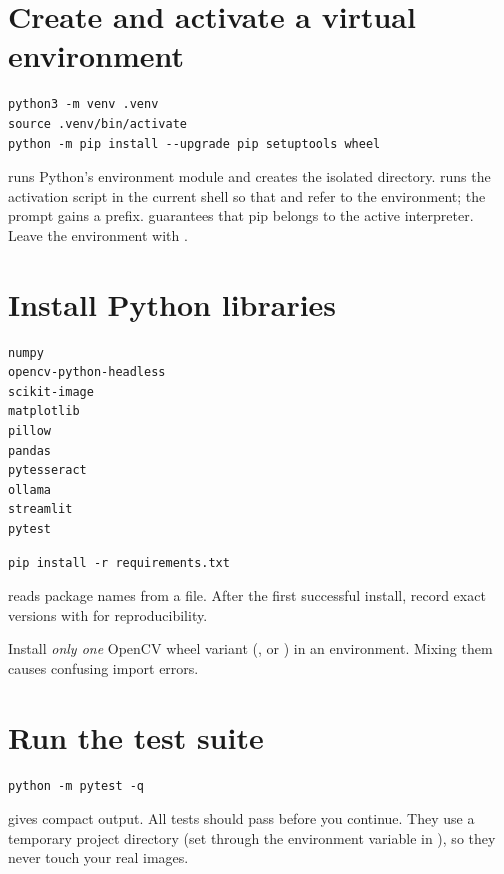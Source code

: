 \section{Create and activate a virtual environment}
\begin{lstlisting}[style=sh]
python3 -m venv .venv
source .venv/bin/activate
python -m pip install --upgrade pip setuptools wheel
\end{lstlisting}
 runs Python's environment module and creates the isolated  directory.  runs the activation script in the current shell so that  and  refer to the environment; the prompt gains a  prefix.  guarantees that pip belongs to the active interpreter. Leave the environment with .

\section{Install Python libraries}
\begin{lstlisting}[style=plain,caption={requirements.txt}]
numpy
opencv-python-headless
scikit-image
matplotlib
pillow
pandas
pytesseract
ollama
streamlit
pytest
\end{lstlisting}
\begin{lstlisting}[style=sh]
pip install -r requirements.txt
\end{lstlisting}
 reads package names from a file. After the first successful install, record exact versions with  for reproducibility.

\begin{warnbox}
Install \emph{only one} OpenCV wheel variant (,  or ) in an environment. Mixing them causes confusing import errors.
\end{warnbox}

\section{Run the test suite}
\begin{lstlisting}[style=sh]
python -m pytest -q
\end{lstlisting}
 gives compact output. All tests should pass before you continue. They use a temporary project directory (set through the  environment variable in ), so they never touch your real images.


